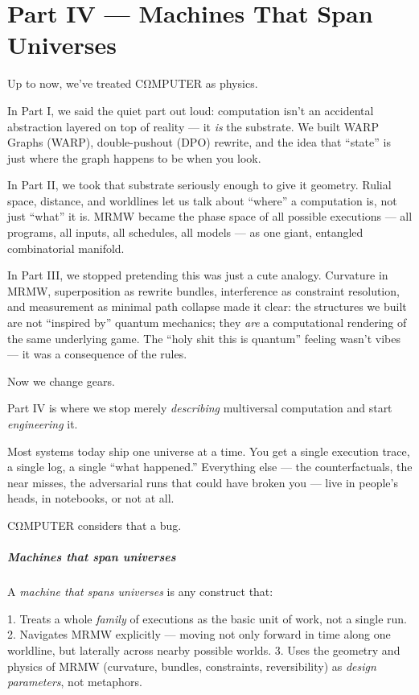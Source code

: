 \chapter*{Part IV --- Machines That Span Universes}

Up to now, we've treated CΩMPUTER as physics.

In Part I, we said the quiet part out loud: computation isn’t an accidental abstraction layered on top of reality — it \emph{is} the substrate. We built WARP Graphs (WARP), double-pushout (DPO) rewrite, and the idea that “state” is just where the graph happens to be when you look.

In Part II, we took that substrate seriously enough to give it geometry. Rulial space, distance, and worldlines let us talk about “where” a computation is, not just “what” it is. MRMW became the phase space of all possible executions — all programs, all inputs, all schedules, all models — as one giant, entangled combinatorial manifold.

In Part III, we stopped pretending this was just a cute analogy. Curvature in MRMW, superposition as rewrite bundles, interference as constraint resolution, and measurement as minimal path collapse made it clear: the structures we built are not “inspired by” quantum mechanics; they \emph{are} a computational rendering of the same underlying game. The “holy shit this is quantum” feeling wasn’t vibes — it was a consequence of the rules.

Now we change gears.

Part IV is where we stop merely \emph{describing} multiversal computation and start \emph{engineering} it.

Most systems today ship one universe at a time. You get a single execution trace, a single log, a single “what happened.” Everything else — the counterfactuals, the near misses, the adversarial runs that could have broken you — live in people’s heads, in notebooks, or not at all.

CΩMPUTER considers that a bug.

\paragraph{Machines that span universes}

A \emph{machine that spans universes} is any construct that:

1. Treats a whole \emph{family} of executions as the basic unit of work, not a single run.
2. Navigates MRMW explicitly — moving not only forward in time along one worldline, but laterally across nearby possible worlds.
3. Uses the geometry and physics of MRMW (curvature, bundles, constraints, reversibility) as \emph{design parameters}, not metaphors.

